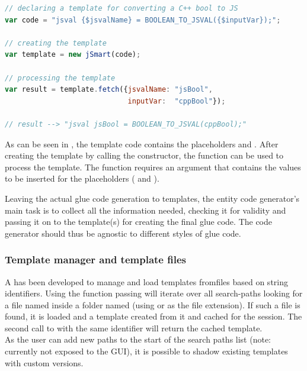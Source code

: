 \SingleSpacing
\begin{lstlisting}[language=JavaScript, caption=Template for converting a \mySCName{bool} to \myProperName{JavaScript} in \myProperName{SpiderMonkey}, label=lst:TemplateBool]
// declaring a template for converting a C++ bool to JS
var code = "jsval {$jsvalName} = BOOLEAN_TO_JSVAL({$inputVar});";

// creating the template
var template = new jSmart(code);

// processing the template
var result = template.fetch({jsvalName: "jsBool", 
                             inputVar:  "cppBool"});
                             
// result --> "jsval jsBool = BOOLEAN_TO_JSVAL(cppBool);"
\end{lstlisting}
\OnehalfSpacing

As can be seen in , the template code contains the placeholders  and . After creating the  template by calling the  constructor, the  function can be used to process the template. The function requires an argument that contains the values to be inserted for the placeholders ( and ).

Leaving the actual glue code generation to templates, the entity code generator's main task is to collect all the information needed, checking it for validity and passing it on to the template(s) for creating the final glue code. The code generator should thus be agnostic to different styles of glue code.

\subsubsection{Template manager and template files}

A  has been developed to manage and load templates from\linebreak files based on string identifiers. Using the  function passing \linebreak{} will iterate over all search-paths looking for a file named  inside a folder named  (using  or  as the file extension). If such a file is found, it is loaded and a  template created from it and cached for the session. The second call to  with the same identifier will return the cached template.\\
As the user can add new paths to the start of the search paths list (note: currently not exposed to the GUI), it is possible to shadow existing templates with custom versions.

